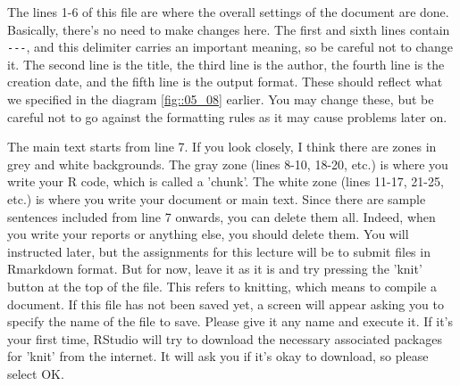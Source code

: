 \documentclass{ltjsbook}
\begin{document}
The lines 1-6 of this file are where the overall settings of the document are done. Basically, there's no need to make changes here.
The first and sixth lines contain \verb|---|, and this delimiter carries an important meaning, so be careful not to change it. The second line is the title, the third line is the author, the fourth line is the creation date, and the fifth line is the output format. These should reflect what we specified in the diagram \ref{fig::05_08} earlier. You may change these, but be careful not to go against the formatting rules as it may cause problems later on.

The main text starts from line 7. If you look closely, I think there are zones in grey and white backgrounds. The gray zone (lines 8-10, 18-20, etc.) is where you write your R code, which is called a 'chunk'. The white zone (lines 11-17, 21-25, etc.) is where you write your document or main text. Since there are sample sentences included from line 7 onwards, you can delete them all. Indeed, when you write your reports or anything else, you should delete them. You will instructed later, but the assignments for this lecture will be to submit files in Rmarkdown format. But for now, leave it as it is and try pressing the 'knit' button at the top of the file. This refers to knitting, which means to compile a document. If this file has not been saved yet, a screen will appear asking you to specify the name of the file to save. Please give it any name and execute it. If it's your first time, RStudio will try to download the necessary associated packages for 'knit' from the internet. It will ask you if it's okay to download, so please select OK.
\end{document}
